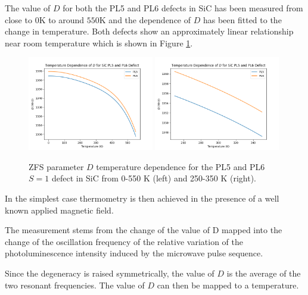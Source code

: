 The value of $D$ for both the PL5 and PL6 defects in SiC has been measured from close to $0$K to around $550$K and the dependence of $D$ has been fitted to the change in temperature. 
Both defects show an approximately linear relationship near room temperature which is shown in Figure \ref{fig:PL5PL6DvsT}.
\begin{figure}[h]
    \begin{center}
    \includegraphics[width=0.49\textwidth]{figures/SiC-PL5PL6-D(T).png}
    \includegraphics[width=0.49\textwidth]{figures/SiC-PL5PL6-D(T)-close.png}
    \caption{ZFS parameter $D$ temperature dependence for the PL5 and PL6 $S=1$ defect in SiC from 0-550 K (left) and 250-350 K (right). }\label{fig:PL5PL6DvsT}
\end{center}
\end{figure}


In the simplest case thermometry is then achieved in the presence of a well known applied magnetic field. 

The measurement stems from the change of the value of
D mapped into the change of the oscillation frequency of the
relative variation of the photoluminescence intensity induced by the microwave pulse sequence.

Since the degeneracy is raised symmetrically, the value of $D$ is the average of the two resonant frequencies. The value of $D$ can then be mapped to a temperature. 

